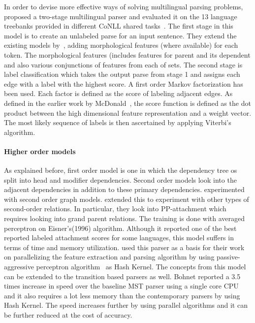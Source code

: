 In order to devise more effective ways of solving multilingual parsing problems,~\cite{McDonald:2006:MDA:1596276.1596317} proposed a two-stage multilingual parser and evaluated it on the 13 language treebanks provided in different CoNLL shared tasks~\citep{Buchholz:2006:CST:1596276.1596305}. The first stage in this model is to create an unlabeled parse for an input sentence. They extend the existing models by~\cite{mcdonald2006online}, adding morphological features (where available) for each token. The morphological features (includes features for parent and its dependent and also various conjunctions of features from each of sets. The second stage is label classification which takes the output parse from stage 1 and assigns each edge with a label with the highest score. A first order Markov factorization has been used. Each factor is defined as the score of labeling adjacent edges. As defined in the earlier work by McDonald~\etal, the score function is defined as the dot product between the high dimensional feature representation and a weight vector. The most likely sequence of labels is then  ascertained by applying Viterbi's algorithm.



\paragraph*{Higher order models}

As explained before, first order model is one in which the dependency tree os split into head and modifier dependencies. Second order models look into the adjacent dependencies in addition to these primary dependencies. \cite{mcdonald2006online} experimented with second order graph models. \cite{carreras2007experiments} extended this to experiment with other types of second-order relations. In particular, they look into PP-attachment which requires looking into grand parent relations. The training is done with averaged perceptron on Eisner's(1996) algorithm. Although it reported one of the best reported labeled attachment scores for some languages, this model suffers in terms of time and memory utilization. \cite{bohnet2010very} used this parser as a basis for their work on parallelizing the feature extraction and parsing algorithm by using passive-aggressive perceptron algorithm~\citep{crammer2006online} as Hash Kernel. The concepts from this model can be extended to the transition based parsers as well. Bohnet reported a 3.5 times increase in speed over the baseline MST parser using a single core CPU and it also requires a lot less memory than the contemporary parsers by using Hash Kernel. The speed increases further by using parallel algorithms and it can be further reduced at the cost of accuracy.


